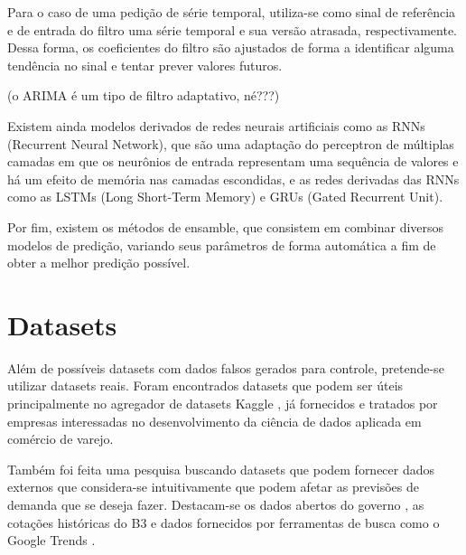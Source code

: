 Para o caso de uma pedição de série temporal, utiliza-se como sinal de referência e de entrada do filtro uma série temporal e sua versão atrasada, respectivamente. Dessa forma, os coeficientes do filtro são ajustados de forma a identificar alguma tendência no sinal e tentar prever valores futuros.

(o ARIMA é um tipo de filtro adaptativo, né???)


Existem ainda modelos derivados de redes neurais artificiais como as RNNs (Recurrent Neural Network), que são uma adaptação do perceptron de múltiplas camadas em que os neurônios de entrada representam uma sequência de valores e há um efeito de memória nas camadas escondidas, e as redes derivadas das RNNs como as LSTMs (Long Short-Term Memory) e GRUs (Gated Recurrent Unit).

Por fim, existem os métodos de ensamble, que consistem em combinar diversos modelos de predição, variando seus parâmetros de forma automática a fim de obter a melhor predição possível.

\section{Datasets}

Além de possíveis datasets com dados falsos gerados para controle, pretende-se utilizar datasets reais. Foram encontrados datasets que podem ser úteis principalmente no agregador de datasets Kaggle \cite{kaggle}, já fornecidos e tratados por empresas interessadas no desenvolvimento da ciência de dados aplicada em comércio de varejo. \cite{olist} \cite{rees46}

Também foi feita uma pesquisa buscando datasets que podem fornecer dados externos que considera-se intuitivamente que podem afetar as previsões de demanda que se deseja fazer. Destacam-se os dados abertos do governo \cite{governo}, as cotações históricas do B3 \cite{b3} e dados fornecidos por ferramentas de busca como o Google Trends \cite{googletrends}.